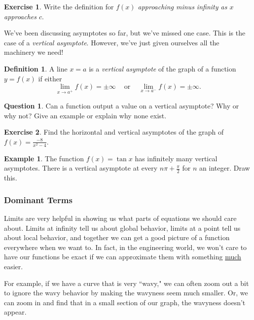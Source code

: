 \documentclass[leqno]{article}
\theoremstyle{definition}
\newtheorem{definition}{Definition}[section]
\newtheorem{example}{Example}[section]
\newtheorem{question}{Question}[section]
\newtheorem{exercise}{Exercise}[section]
\theoremstyle{remark}
\theoremstyle{theorem}
\begin{document}
\begin{exercise}
Write the definition for \emph{$f(x)$ approaching minus infinity as $x$ approaches $c$}.
\vspace*{4cm}
\end{exercise}

We've been discussing asymptotes so far, but we've missed one case.  This is the case of a \emph{vertical asymptote}.  However, we've just given ourselves all the machinery we need!

\begin{definition}
A line $x=a$ is a \emph{vertical asymptote} of the graph of a function $y=f(x)$ if either
\[
\lim_{x\to a^+} f(x)=\pm \infty ~~~~\textrm{ or } ~~~~ \lim_{x\to a^-}f(x)=\pm \infty.
\]
\end{definition}

\begin{question}
Can a function output a value on a vertical asymptote? Why or why not?  Give an example or explain why none exist.
\vspace*{6cm}
\end{question}

\begin{exercise}
Find the horizontal and vertical asymptotes of the graph of $f(x)=\frac{-8}{x^2-4}$. 
\vspace*{6cm}
\end{exercise}

\begin{example}
The function $f(x)=\tan x$ has infinitely many vertical asymptotes.  There is a vertical asymptote at every $n\pi + \frac{\pi}{2}$ for $n$ an integer. Draw this.
\vspace*{5cm}
\end{example}

\subsubsection{Dominant Terms}

Limits are very helpful in showing us what parts of equations we should care about.  Limits at infinity tell us about global behavior, limits at a point tell us about local behavior, and together we can get a good picture of a function everywhere when we want to.  In fact, in the engineering world, we won't care to have our functions be exact if we can approximate them with something \underline{much} easier.  

For example, if we have a curve that is very ``wavy," we can often zoom out a bit to ignore the wavy behavior by making the wavyness seem much smaller. Or, we can zoom in and find that in a small section of our graph, the wavyness doesn't appear.
\end{document}
